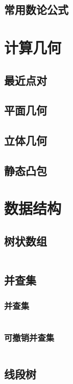 \documentclass[a4paper, twoside]{article}
\begin{document}
\subsection{常用数论公式}

\newpage
\section{计算几何}
\subsection{最近点对}

\subsection{平面几何}

\subsection{立体几何}

\subsection{静态凸包}

\newpage
\section{数据结构}
\subsection{树状数组}
\inputminted{cpp}{../src/数据结构/树状数组.cpp}

\subsection{并查集}
    \subsubsection{并查集}
    \inputminted{cpp}{../src/数据结构/并查集.cpp}

    \subsubsection{可撤销并查集}
    \inputminted{cpp}{../src/数据结构/可撤销并查集.cpp}

\subsection{线段树}
\end{document}
